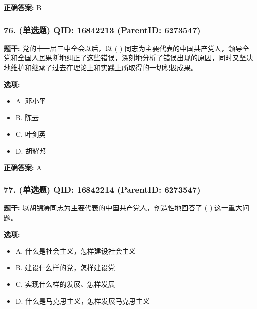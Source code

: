 \documentclass[12pt,UTF8]{ctexart}
\begin{document}
\textbf{正确答案:}
B

\vspace{0.3em}\hrulefill\vspace{0.7em}

\subsubsection*{76. (单选题) \small QID: 16842213 (ParentID: 6273547)}

\textbf{题干:}
党的十一届三中全会以后，以 ( ) 同志为主要代表的中国共产党人，领导全党和全国人民果断地纠正了这些错误，深刻地分析了错误出现的原因，同时又坚决地维护和继承了过去在理论上和实践上所取得的一切积极成果。



\textbf{选项:}
\begin{itemize}[leftmargin=*]

  \item A. 邓小平

  \item B. 陈云

  \item C. 叶剑英

  \item D. 胡耀邦

\end{itemize}

\textbf{正确答案:}
A

\vspace{0.3em}\hrulefill\vspace{0.7em}

\subsubsection*{77. (单选题) \small QID: 16842214 (ParentID: 6273547)}

\textbf{题干:}
以胡锦涛同志为主要代表的中国共产党人，创造性地回答了 ( ) 这一重大问题。



\textbf{选项:}
\begin{itemize}[leftmargin=*]

  \item A. 什么是社会主义，怎样建设社会主义

  \item B. 建设什么样的党，怎样建设党

  \item C. 实现什么样的发展、怎样发展

  \item D. 什么是马克思主义，怎样发展马克思主义

\end{itemize}
\end{document}
